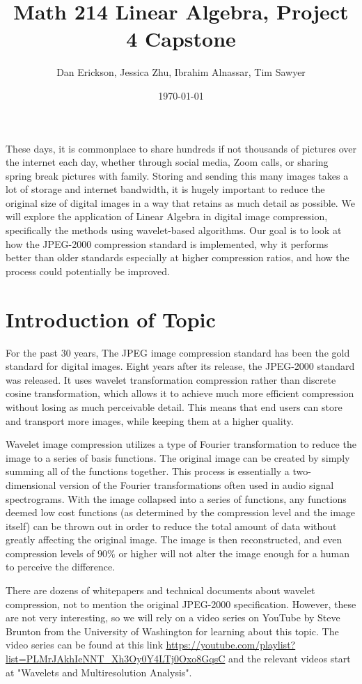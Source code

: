 \documentclass[12pt]{article}
\title{ Math 214 Linear Algebra, Project 4 Capstone }
\date{\today}
\author{Dan Erickson, Jessica Zhu, Ibrahim Alnassar, Tim Sawyer}
\begin{document}
\maketitle

These days, it is commonplace to share hundreds if not thousands of pictures over the internet each day, whether through social media, Zoom calls, or sharing spring break pictures with family. Storing and sending this many images takes a lot of storage and internet bandwidth, it is hugely important to reduce the original size of digital images in a way that retains as much detail as possible. We will explore the application of Linear Algebra in digital image compression, specifically the methods using wavelet-based algorithms. Our goal is to look at how the JPEG-2000 compression standard is implemented, why it performs better than older standards especially at higher compression ratios, and how the process could potentially be improved.

\section{Introduction of Topic}

For the past 30 years, The JPEG image compression standard has been the gold standard for digital images. Eight years after its release, the JPEG-2000 standard was released. It uses wavelet transformation compression rather than discrete cosine transformation, which allows it to achieve much more efficient compression without losing as much perceivable detail. This means that end users can store and transport more images, while keeping them at a higher quality.

Wavelet image compression utilizes a type of Fourier transformation to reduce the image to a series of basis functions. The original image can be created by simply summing all of the functions together. This process is essentially a two-dimensional version of the Fourier transformations often used in audio signal spectrograms. With the image collapsed into a series of functions, any functions deemed low cost functions (as determined by the compression level and the image itself) can be thrown out in order to reduce the total amount of data without greatly affecting the original image. The image is then reconstructed, and even compression levels of $ 90\% $ or higher will not alter the image enough for a human to perceive the difference.

There are dozens of whitepapers and technical documents about wavelet compression, not to mention the original JPEG-2000 specification. However, these are not very interesting, so we will rely on a video series on YouTube by Steve Brunton from the University of Washington for learning about this topic. The video series can be found at this link \url{https://youtube.com/playlist?list=PLMrJAkhIeNNT_Xh3Oy0Y4LTj0Oxo8GqsC} and the relevant videos start at "Wavelets and Multiresolution Analysis".
\end{document}
